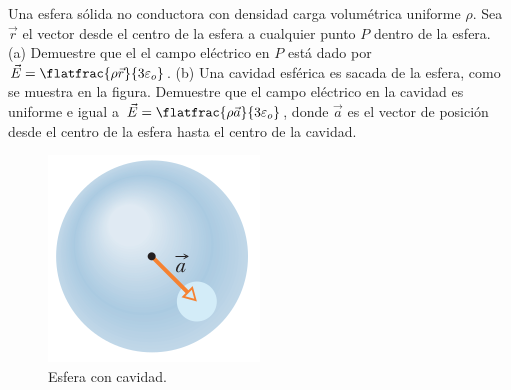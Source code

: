 \begin{mdframed}[style=warning]
	\begin{ejercicio}
		Una esfera sólida no conductora con densidad carga volumétrica uniforme $\rho$. Sea $\vec{r}$ el vector desde el centro de la esfera a cualquier punto $P$ dentro de la esfera. (a) Demuestre que el el campo eléctrico en $P$ está dado por $\vec{E} = \flatfrac{\rho \vec{r}}{3\varepsilon _o}$. (b) Una cavidad esférica es sacada de la esfera, como se muestra en la figura. Demuestre que el campo eléctrico en la cavidad es uniforme e igual a $\vec{E} = \flatfrac{\rho \vec{a}}{3\varepsilon _o}$, donde $\vec{a}$ es el vector de posición desde el centro de la esfera hasta el centro de la cavidad.
		\begin{figure}[H]
			\centering
			\includegraphics[scale=0.5]{./img/sphere.png}
			\caption{Esfera con cavidad.}
			\label{sphere}
		\end{figure}
	\end{ejercicio}
\end{mdframed}










































